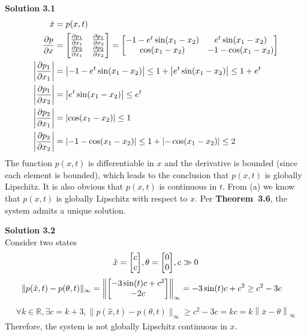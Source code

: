 \documentclass[a4paper,10.5pt]{article}
\newcommand{\R}{\mathbb{R}}
\newcommand{\abs}[1]{\left|#1\right|}
\newcommand{\norm}[1]{\left\lVert#1\right\rVert}
\newenvironment{mymat}{\left[\begin{matrix}}{\end{matrix}\right]}
\begin{document}
\noindent \textbf {Solution 3.1}
\begin{align*}
	\dot{x} &= p(x,t) \\
	\frac{\partial p}{\partial x} &=  \begin{mymat}\frac{\partial p_1}{\partial x_1} & \frac{\partial p_1}{\partial x_2} \\
	\frac{\partial p_2}{\partial x_1} & \frac{\partial p_2}{\partial x_2}
	\end{mymat} = \begin{mymat}
	-1 - e^t \sin(x_1-x_2) & e^t \sin (x_1-x_2) \\
	\cos(x_1-x_2) & -1-\cos(x_1-x_2)
	\end{mymat} \\
	\abs{\frac{\partial p_1}{\partial x_1}} &=  \abs{-1 - e^t \sin(x_1-x_2)} \leq 1+\abs{e^t \sin(x_1-x_2)} \leq 1+e^t\\
	\abs{\frac{\partial p_1}{\partial x_2}} &= \abs{e^t \sin (x_1-x_2)} \leq e^t\\
	\abs{\frac{\partial p_2}{\partial x_1}} &= \abs{\cos(x_1-x_2)} \leq 1\\
	\abs{\frac{\partial p_2}{\partial x_2}} &=\abs{-1-\cos(x_1-x_2)}\leq 1 + \abs{-\cos(x_1-x_2)} \leq 2
\end{align*}
The function $p(x,t)$ is differentiable in $x$ and the derivative is bounded (since each element is bounded), which leads to the conclusion that $p(x,t)$ is globally Lipschitz. It is also obvious that $p(x,t)$ is continuous in $t$. From (a) we know that $p(x,t)$ is globally Lipschitz with respect to $x$. Per \textbf{Theorem~{3.6}}, the system admits a unique solution. \\

\clearpage

\noindent \textbf {Solution 3.2} \\
Consider two states
\begin{align*}
\hat{x} = \begin{mymat}c\\c\end{mymat}, \theta = \begin{mymat}0\\0\end{mymat}, c\gg 0
\end{align*}
\begin{align*}
\|p(\hat{x},t)-p(\theta,t)\|_\infty = \norm{\begin{mymat}
	-3\sin(t)c+c^2\\-2c
	\end{mymat}}_\infty&=-3\sin(t)c+c^2 \geq c^2-3c
\end{align*}
\begin{align*}
\forall k \in \R, \exists c=k+3,\|p(\hat{x},t)-p(\theta,t)\|_\infty \geq c^2-3c = kc = k\norm{\bar{x}-\theta}_\infty
\end{align*}
Therefore, the system is not globally Lipschitz continuous in $x$. \\
\end{document}
